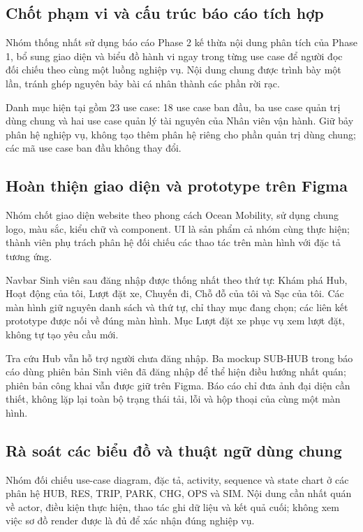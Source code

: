 \documentclass[10pt,a4paper]{article}
\begin{document}
\subsection{Chốt phạm vi và cấu trúc báo cáo tích hợp}
Nhóm thống nhất sử dụng báo cáo Phase 2 kế thừa nội dung phân tích của Phase 1, bổ sung giao diện và biểu đồ hành vi ngay trong từng use case để người đọc đối chiếu theo cùng một luồng nghiệp vụ. Nội dung chung được trình bày một lần, tránh ghép nguyên bảy bài cá nhân thành các phần rời rạc.

Danh mục hiện tại gồm 23 use case: 18 use case ban đầu, ba use case quản trị dùng chung và hai use case quản lý tài nguyên của Nhân viên vận hành. Giữ bảy phân hệ nghiệp vụ, không tạo thêm phân hệ riêng cho phần quản trị dùng chung; các mã use case ban đầu không thay đổi.

\subsection{Hoàn thiện giao diện và prototype trên Figma}
Nhóm chốt giao diện website theo phong cách Ocean Mobility, sử dụng chung logo, màu sắc, kiểu chữ và component. UI là sản phẩm cả nhóm cùng thực hiện; thành viên phụ trách phân hệ đối chiếu các thao tác trên màn hình với đặc tả tương ứng.

Navbar Sinh viên sau đăng nhập được thống nhất theo thứ tự: Khám phá Hub, Hoạt động của tôi, Lượt đặt xe, Chuyến đi, Chỗ đỗ của tôi và Sạc của tôi. Các màn hình giữ nguyên danh sách và thứ tự, chỉ thay mục đang chọn; các liên kết prototype được nối về đúng màn hình. Mục Lượt đặt xe phục vụ xem lượt đặt, không tự tạo yêu cầu mới.

Tra cứu Hub vẫn hỗ trợ người chưa đăng nhập. Ba mockup SUB-HUB trong báo cáo dùng phiên bản Sinh viên đã đăng nhập để thể hiện điều hướng nhất quán; phiên bản công khai vẫn được giữ trên Figma. Báo cáo chỉ đưa ảnh đại diện cần thiết, không lặp lại toàn bộ trạng thái tải, lỗi và hộp thoại của cùng một màn hình.

\subsection{Rà soát các biểu đồ và thuật ngữ dùng chung}
Nhóm đối chiếu use-case diagram, đặc tả, activity, sequence và state chart ở các phân hệ HUB, RES, TRIP, PARK, CHG, OPS và SIM. Nội dung cần nhất quán về actor, điều kiện thực hiện, thao tác ghi dữ liệu và kết quả cuối; không xem việc sơ đồ render được là đủ để xác nhận đúng nghiệp vụ.
\end{document}
